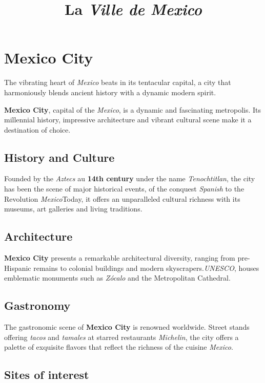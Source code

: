 \documentclass[12pt, a4paper]{article}
\title{La \textit{Ville de Mexico}}
\author{}
\date{}
\begin{document}
\maketitle

\section{\textbf{Mexico City}}

The vibrating heart of \textit{Mexico} beats in its tentacular capital, a city that harmoniously blends ancient history with a dynamic modern spirit.

\textbf{Mexico City}, capital of the \textit{Mexico}, is a dynamic and fascinating metropolis. Its millennial history, impressive architecture and vibrant cultural scene make it a destination of choice.

\subsection*{\textbf{History and Culture}}

Founded by the \textit{Aztecs} au \textbf{14th century} under the name \textit{Tenochtitlan}, the city has been the scene of major historical events, of the conquest \textit{Spanish} to the Revolution \textit{Mexico}Today, it offers an unparalleled cultural richness with its museums, art galleries and living traditions.

\subsection*{\textbf{Architecture}}
    
\textbf{Mexico City} presents a remarkable architectural diversity, ranging from pre-Hispanic remains to colonial buildings and modern skyscrapers.\textit{UNESCO}, houses emblematic monuments such as \textit{Zócalo} and the Metropolitan Cathedral.

\subsection*{\textbf{Gastronomy}}

The gastronomic scene of \textbf{Mexico City} is renowned worldwide. Street stands offering \textit{tacos} and \textit{tamales} at starred restaurants \textit{Michelin}, the city offers a palette of exquisite flavors that reflect the richness of the cuisine \textit{Mexico}.

\subsection*{\textbf{Sites of interest}}
\end{document}
